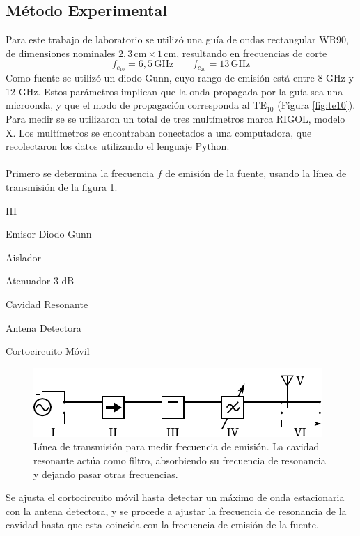 \documentclass[11pt,a4paper]{article}
\begin{document}
\begin{multicols}{2}
\section{Método Experimental}
Para este trabajo de laboratorio se utilizó una guía de ondas rectangular WR90, de dimensiones nominales $2,3\, \mathrm{cm} \times 1\, \mathrm{cm}$, resultando en frecuencias de corte
\begin{equation}
    f_{c_{10}} = 6,5\, \mathrm{GHz} \qquad f_{c_{20}}=13\,\mathrm{GHz}
\end{equation} 
Como fuente se utilizó un diodo Gunn, cuyo rango de emisión está entre 8 GHz y 12 GHz. 
Estos parámetros implican que la onda propagada por la guía sea una microonda, y que el modo de propagación corresponda al TE$_{10}$ (Figura \ref{fig:te10}).\\

Para medir se se utilizaron un total de tres multímetros marca RIGOL, modelo X. Los multímetros se encontraban conectados a una computadora, que recolectaron los datos utilizando el lenguaje Python.\\ \\


Primero se determina la frecuencia $f$ de emisión de la fuente, usando la línea de transmisión de la figura \ref{fig:arr1}.
\begin{multicols}{2}
    \begin{labeling}{III} 
        \item [I] Emisor Diodo Gunn
        \item [II] Aislador
        \item [III] Atenuador 3 dB
        \item [IV] Cavidad Resonante
        \item [V] Antena Detectora
        \item [VI] Cortocircuito Móvil
    \end{labeling}        
\end{multicols}
\begin{figure}[H]
    \centering
    \includegraphics[width=\linewidth]{Images/arreglo1.pdf}
    \caption{Línea de transmisión para medir frecuencia de emisión. La cavidad resonante actúa como filtro, absorbiendo su frecuencia de resonancia y dejando pasar otras frecuencias.}
    \label{fig:arr1}
\end{figure}
Se ajusta el cortocircuito móvil hasta detectar un máximo de onda estacionaria con la antena detectora, y se procede a ajustar la frecuencia de resonancia de la cavidad hasta que esta coincida con la frecuencia de emisión de la fuente.\\ 


\end{multicols}
\end{document}
